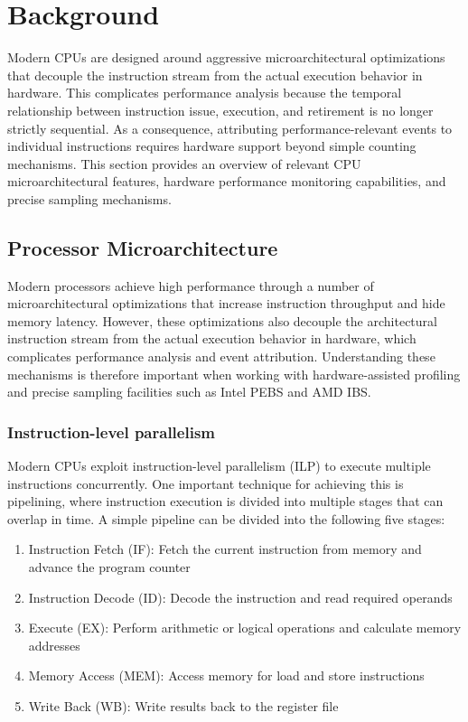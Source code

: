 \chapter{Background}\label{chap:background}

Modern CPUs are designed around aggressive microarchitectural optimizations that decouple the instruction stream from the actual execution behavior in hardware. This complicates performance analysis because the temporal relationship between instruction issue, execution, and retirement is no longer strictly sequential. As a consequence, attributing performance-relevant events to individual instructions requires hardware support beyond simple counting mechanisms.
This section provides an overview of relevant CPU microarchitectural features, hardware performance monitoring capabilities, and precise sampling mechanisms.

\section{Processor Microarchitecture}
\label{sec:processor-microarchitecture}

Modern processors achieve high performance through a number of microarchitectural optimizations that increase instruction throughput and hide memory latency. However, these optimizations also decouple the architectural instruction stream from the actual execution behavior in hardware, which complicates performance analysis and event attribution. Understanding these mechanisms is therefore important when working with hardware-assisted profiling and precise sampling facilities such as Intel PEBS and AMD IBS.

\subsection{Instruction-level parallelism}

Modern CPUs exploit instruction-level parallelism (ILP) to execute multiple instructions concurrently. One important technique for achieving this is pipelining, where instruction execution is divided into multiple stages that can overlap in time\cite[C.1]{Hennessy2011}. A simple pipeline can be divided into the following five stages:
\begin{enumerate}
    \item Instruction Fetch (IF): Fetch the current instruction from memory and advance the program counter
    \item Instruction Decode (ID): Decode the instruction and read required operands
    \item Execute (EX): Perform arithmetic or logical operations and calculate memory addresses
    \item Memory Access (MEM): Access memory for load and store instructions
    \item Write Back (WB): Write results back to the register file
\end{enumerate}

